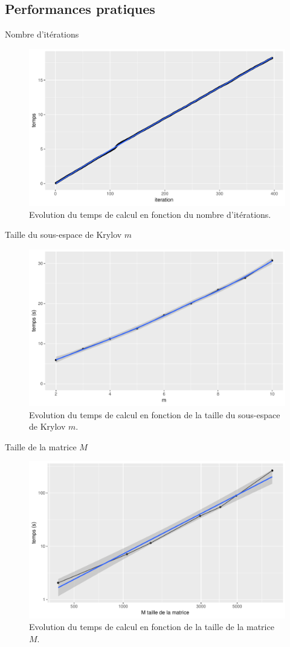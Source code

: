 \documentclass[9.5pt]{beamer}
\begin{document}
	\subsection{Performances pratiques}
		\begin{frame}{Nombre d'itérations}
			\begin{figure}
				\centering
				\includegraphics[width = 0.7\linewidth]{../rapport/plots/tvsiter.pdf}
				\caption{Evolution du temps de calcul en fonction du nombre d'itérations. \label{fig:tvsiter}}
			\end{figure}
		\end{frame}

		\begin{frame}{Taille du sous-espace de Krylov $m$}
			\begin{figure}
				\centering
				\includegraphics[width = 0.7\linewidth]{../rapport/plots/tvsm.pdf}
				\caption{Evolution du temps de calcul en fonction de la taille du sous-espace de Krylov $m$. \label{fig:tvsm}}
			\end{figure}
		\end{frame}

		\begin{frame}{Taille de la matrice $M$}
			\begin{figure}
				\centering
				\includegraphics[width = 0.7\linewidth]{../rapport/plots/tvsM.pdf}
				\caption{Evolution du temps de calcul en fonction de la taille de la matrice $M$. \label{fig:tvsM}}
			\end{figure}
		\end{frame}
\end{document}
